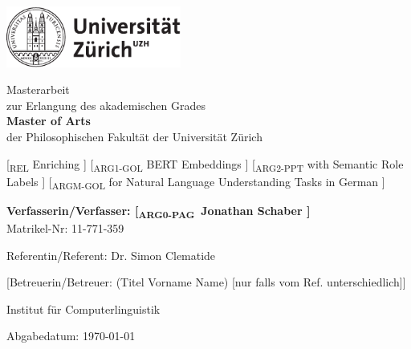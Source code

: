\begin{titlepage}
\includegraphics[height=20mm]{images/uzh_logo_d_pos}\\

\begin{center}

{\sffamily
Masterarbeit \\
zur Erlangung des akademischen Grades \\
\textbf{Master of Arts} \\
der Philosophischen Fakultät der Universität Zürich \\

\vspace{2cm}

{\Large
        {\color{light-gray} [\textsubscript{REL}} Enriching{\color{light-gray} ]}
        {\color{light-gray} [\textsubscript{ARG1-GOL}} BERT Embeddings{\color{light-gray} ]}
        {\color{light-gray} [\textsubscript{ARG2-PPT}} with Semantic Role Labels{\color{light-gray} ]}
        {\color{light-gray} [\textsubscript{ARGM-GOL}} for Natural Language Understanding Tasks in German{\color{light-gray} ]} %
}\\

\vspace{4cm}

\textbf{Verfasserin/Verfasser: {\color{light-gray} [\textsubscript{ARG0-PAG}} Jonathan Schaber{\color{light-gray} ]}} \\
	Matrikel-Nr: 11-771-359 \\

\vspace{2cm}

Referentin/Referent: Dr. Simon Clematide

[Betreuerin/Betreuer: (Titel Vorname Name) {\small [nur falls vom Ref. unterschiedlich]}]

Institut f\"ur Computerlinguistik

\vfill Abgabedatum: \today

\vspace{3cm}
}
\end{center}

\end{titlepage}

\newpage
